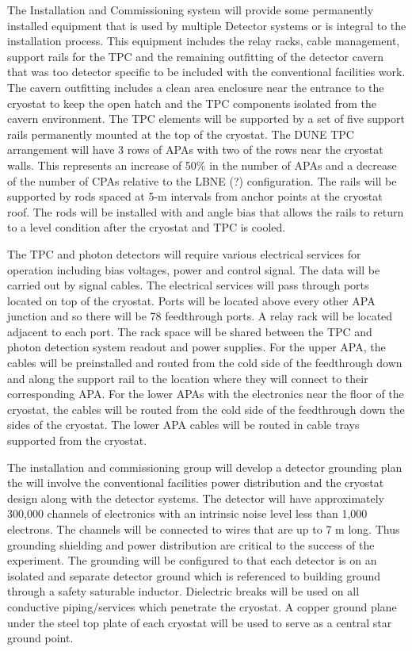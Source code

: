 The Installation and Commissioning system will provide some permanently installed equipment that is 
used by multiple Detector systems or is integral to the installation process. This equipment includes the 
relay racks, cable management, support rails for the TPC and the remaining outfitting of the detector 
cavern that was too detector specific to be included with the conventional facilities work. The cavern 
outfitting includes a clean area enclosure near the entrance to the cryostat to keep the open hatch and the 
TPC components isolated from the cavern environment. The TPC elements will be supported by a set of 
five support rails permanently mounted at the top of the cryostat. The DUNE TPC arrangement will have 3 
rows of APAs with two of the rows near the cryostat walls. This represents an increase of 50\% in the 
number of APAs and a decrease of the number of CPAs relative to the LBNE (?) configuration. The rails will 
be supported by rods spaced at 5-m intervals from anchor points at the cryostat roof. The rods will be 
installed with and angle bias that allows the rails to return to a level condition after the cryostat and TPC is 
cooled. 

The TPC and photon detectors will require various electrical services for operation including bias voltages, 
power and control signal. The data will be carried out by signal cables. The electrical services will pass 
through ports located on top of the cryostat. Ports will be located above every other APA junction and so 
there will be 78 feedthrough ports. A relay rack will be located adjacent to each port. The rack space will 
be shared between the TPC and photon detection system readout and power supplies. For the upper APA, 
the cables will be preinstalled and routed from the cold side of the feedthrough down and along the 
support rail to the location where they will connect to their corresponding APA. For the lower APAs with 
the electronics near the floor of the cryostat, the cables will be routed from the cold side of the 
feedthrough down the sides of the cryostat. The lower APA cables will be routed in cable trays supported 
from the cryostat.

The installation and commissioning group will develop a detector grounding plan the will involve the 
conventional facilities power distribution and the cryostat design along with the detector systems.  The 
detector will have approximately 300,000 channels of electronics with an intrinsic noise level less than 
1,000 electrons. The channels will be connected to wires that are up to 7 m long. Thus grounding 
shielding and power distribution are critical to the success of the experiment. The grounding will be 
configured to that each detector is on an isolated and separate detector ground which is referenced to 
building ground through a safety saturable inductor.  Dielectric breaks will be used on all conductive 
piping/services which penetrate the cryostat.  A copper ground plane under the steel top plate of each 
cryostat will be used to serve as a central star ground point. 

